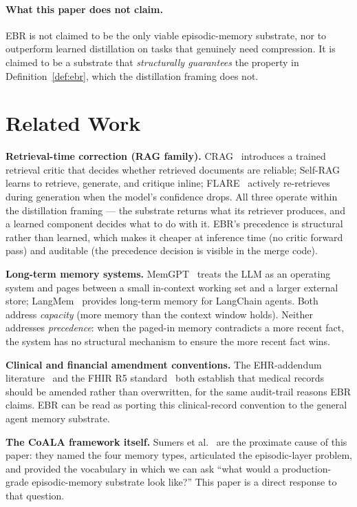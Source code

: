 \documentclass[11pt,a4paper]{article}
\begin{document}
\paragraph{What this paper does not claim.}
EBR is not claimed to be the only viable episodic-memory substrate, nor to outperform
learned distillation on tasks that genuinely need compression. It is claimed to be a
substrate that \emph{structurally guarantees} the property in Definition~\ref{def:ebr},
which the distillation framing does not.

\section{Related Work}
\label{sec:related}

\noindent
\textbf{Retrieval-time correction (RAG family).} CRAG~\cite{yan2024crag} introduces a
trained retrieval critic that decides whether retrieved documents are reliable;
Self-RAG~\cite{asai2023selfrag} learns to retrieve, generate, and critique inline;
FLARE~\cite{jiang2023flare} actively re-retrieves during generation when the model's
confidence drops. All three operate within the distillation framing --- the substrate
returns what its retriever produces, and a learned component decides what to do with
it. EBR's precedence is structural rather than learned, which makes it cheaper at
inference time (no critic forward pass) and auditable (the precedence decision is
visible in the merge code).

\noindent
\textbf{Long-term memory systems.} MemGPT~\cite{memgpt2023} treats the LLM as an
operating system and pages between a small in-context working set and a larger external
store; LangMem~\cite{langmem2024} provides long-term memory for LangChain agents. Both
address \emph{capacity} (more memory than the context window holds). Neither addresses
\emph{precedence}: when the paged-in memory contradicts a more recent fact, the system
has no structural mechanism to ensure the more recent fact wins.

\noindent
\textbf{Clinical and financial amendment conventions.} The EHR-addendum
literature~\cite{addendum2018} and the FHIR R5 standard~\cite{fhir2023} both establish
that medical records should be amended rather than overwritten, for the same audit-trail
reasons EBR claims. EBR can be read as porting this clinical-record convention to the
general agent memory substrate.

\noindent
\textbf{The CoALA framework itself.} Sumers et al.~\cite{sumers2024coala} are the
proximate cause of this paper: they named the four memory types, articulated the
episodic-layer problem, and provided the vocabulary in which we can ask ``what would a
production-grade episodic-memory substrate look like?'' This paper is a direct response
to that question.
\end{document}
